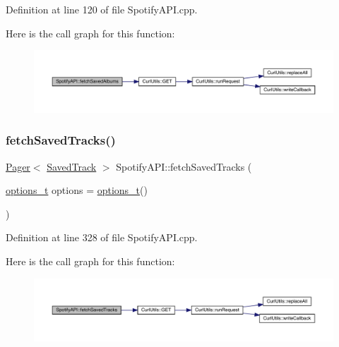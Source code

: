Definition at line 120 of file Spotify\+A\+P\+I.\+cpp.

Here is the call graph for this function\+:
\nopagebreak
\begin{figure}[H]
\begin{center}
\leavevmode
\includegraphics[width=350pt]{class_spotify_a_p_i_a3a1c8e4ea736afdb697560b0bd9783ef_cgraph}
\end{center}
\end{figure}
\mbox{\label{class_spotify_a_p_i_a2e725426d46ab8395940048e2acb9fbc}} 
\subsubsection{\texorpdfstring{fetch\+Saved\+Tracks()}{fetchSavedTracks()}}
{\footnotesize\ttfamily \mbox{\hyperlink{class_pager}{Pager}}$<$ \mbox{\hyperlink{class_saved_track}{Saved\+Track}} $>$ Spotify\+A\+P\+I\+::fetch\+Saved\+Tracks (\begin{DoxyParamCaption}\item[{\mbox{\hyperlink{_spotify_a_p_i_8h_a0ff5cac1a4007bb330b7d9939650c283}{options\+\_\+t}}}]{options = {\ttfamily \mbox{\hyperlink{_spotify_a_p_i_8h_a0ff5cac1a4007bb330b7d9939650c283}{options\+\_\+t}}()} }\end{DoxyParamCaption})}



Definition at line 328 of file Spotify\+A\+P\+I.\+cpp.

Here is the call graph for this function\+:
\nopagebreak
\begin{figure}[H]
\begin{center}
\leavevmode
\includegraphics[width=350pt]{class_spotify_a_p_i_a2e725426d46ab8395940048e2acb9fbc_cgraph}
\end{center}
\end{figure}
\mbox{\label{class_spotify_a_p_i_a3244fda7378b2315accdf00f2d22e40f}} 
